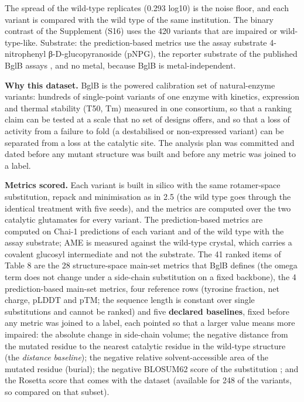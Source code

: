 \documentclass[
  10pt,
]{article}
\DeclareRobustCommand{\_}{\textunderscore\hspace{0pt}}
\begin{document}
The spread of the
wild-type replicates
(0.293 log10) is the
noise floor, and
each variant is
compared with the
wild type of the
same institution.
The binary contrast
of the Supplement
(S16) uses the 420
variants that are
impaired or
wild-type-like.
Substrate: the
prediction-based
metrics use the
assay substrate
4-nitrophenyl
β-D-glucopyranoside
(pNPG), the reporter
substrate of the
published BglB
assays
\cite{carlin2016,carlin2017},
and no metal,
because BglB is
metal-independent.

\textbf{Why this
dataset.} BglB is
the powered
calibration set of
natural-enzyme
variants: hundreds
of single-point
variants of one
enzyme with
kinetics, expression
and thermal
stability (T50, Tm)
measured in one
consortium, so that
a ranking claim can
be tested at a scale
that no set of
designs offers, and
so that a loss of
activity from a
failure to fold (a
destabilised or
non-expressed
variant) can be
separated from a
loss at the
catalytic site. The
analysis plan was
committed and dated
before any mutant
structure was built
and before any
metric was joined to
a label.

\textbf{Metrics
scored.} Each
variant is built in
silico with the same
rotamer-space
substitution, repack
and minimisation as
in 2.5 (the wild
type goes through
the identical
treatment with five
seeds), and the
metrics are computed
over the two
catalytic glutamates
for every variant.
The prediction-based
metrics are computed
on Chai-1
predictions of each
variant and of the
wild type with the
assay substrate; AME
is measured against
the wild-type
crystal, which
carries a covalent
glucosyl
intermediate and not
the substrate. The
41 ranked items of
Table 8 are the 28
structure-space
main-set metrics
that BglB defines
(the omega term does
not change under a
side-chain
substitution on a
fixed backbone), the
4 prediction-based
main-set metrics,
four reference rows
(tyrosine fraction,
net charge, pLDDT
and pTM; the
sequence length is
constant over single
substitutions and
cannot be ranked)
and five
\textbf{declared
baselines}, fixed
before any metric
was joined to a
label, each pointed
so that a larger
value means more
impaired: the
absolute change in
side-chain volume;
the negative
distance from the
mutated residue to
the nearest
catalytic residue in
the wild-type
structure (the
\emph{distance
baseline}); the
negative relative
solvent-accessible
area of the mutated
residue (burial);
the negative
BLOSUM62 score of
the substitution
\cite{henikoff1992};
and the Rosetta
score that comes
with the dataset
(available for 248
of the variants, so
compared on that
subset).
\end{document}
